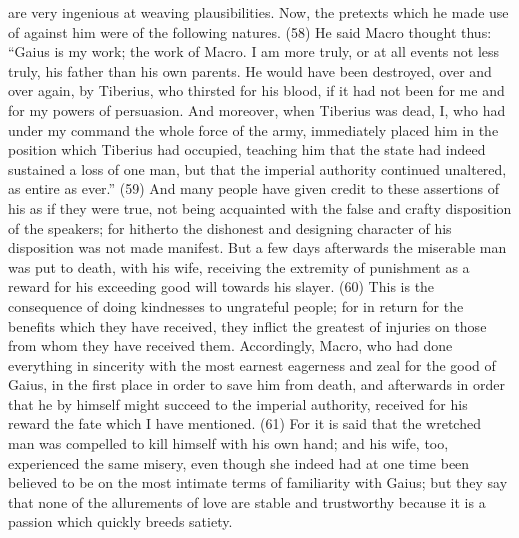 are very ingenious at weaving plausibilities. Now, the pretexts which he made use of against him
were of the following natures. (58) He said Macro thought thus: ``Gaius is my work; the work of
Macro. I am more truly, or at all events not less truly, his father than his own parents. He would
have been destroyed, over and over again, by Tiberius, who thirsted for his blood, if it had not been
for me and for my powers of persuasion. And moreover, when Tiberius was dead, I, who had under
my command the whole force of the army, immediately placed him in the position which Tiberius
had occupied, teaching him that the state had indeed sustained a loss of one man, but that the
imperial authority continued unaltered, as entire as ever.'' (59) And many people have given credit
to these assertions of his as if they were true, not being acquainted with the false and crafty
disposition of the speakers; for hitherto the dishonest and designing character of his disposition
was not made manifest. But a few days afterwards the miserable man was put to death, with his
wife, receiving the extremity of punishment as a reward for his exceeding good will towards his
slayer. (60) This is the consequence of doing kindnesses to ungrateful people; for in return for the
benefits which they have received, they inflict the greatest of injuries on those from whom they
have received them. Accordingly, Macro, who had done everything in sincerity with the most
earnest eagerness and zeal for the good of Gaius, in the first place in order to save him from
death, and afterwards in order that he by himself might succeed to the imperial authority, received
for his reward the fate which I have mentioned. (61) For it is said that the wretched man was
compelled to kill himself with his own hand; and his wife, too, experienced the same misery, even
though she indeed had at one time been believed to be on the most intimate terms of familiarity
with Gaius; but they say that none of the allurements of love are stable and trustworthy because it
is a passion which quickly breeds satiety.

